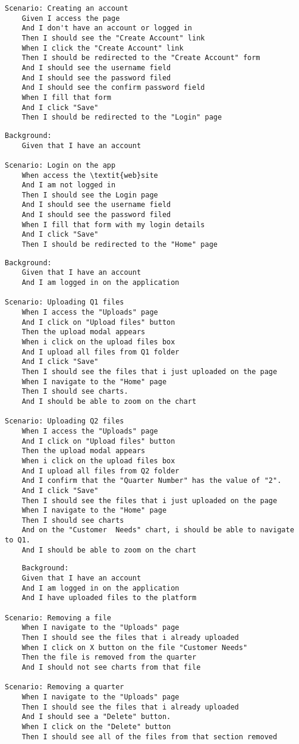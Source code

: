 \begin{verbatim}
Scenario: Creating an account
    Given I access the page 
    And I don't have an account or logged in
    Then I should see the "Create Account" link
    When I click the "Create Account" link
    Then I should be redirected to the "Create Account" form
    And I should see the username field
    And I should see the password filed
    And I should see the confirm password field
    When I fill that form
    And I click "Save"
    Then I should be redirected to the "Login" page
\end{verbatim}



\begin{verbatim}
Background:
	Given that I have an account

Scenario: Login on the app
	When access the \textit{web}site
	And I am not logged in
	Then I should see the Login page
	And I should see the username field
	And I should see the password filed
	When I fill that form with my login details
	And I click "Save"
	Then I should be redirected to the "Home" page
\end{verbatim}
    
\begin{verbatim}
Background:
	Given that I have an account
	And I am logged in on the application

Scenario: Uploading Q1 files
	When I access the "Uploads" page  
	And I click on "Upload files" button 
	Then the upload modal appears 
	When i click on the upload files box
	And I upload all files from Q1 folder
	And I click "Save"
	Then I should see the files that i just uploaded on the page
	When I navigate to the "Home" page
	Then I should see charts. 
	And I should be able to zoom on the chart
	
Scenario: Uploading Q2 files
	When I access the "Uploads" page  
	And I click on "Upload files" button 
	Then the upload modal appears 
	When i click on the upload files box
	And I upload all files from Q2 folder
	And I confirm that the "Quarter Number" has the value of "2".
	And I click "Save"
	Then I should see the files that i just uploaded on the page
	When I navigate to the "Home" page
	Then I should see charts
	And on the "Customer  Needs" chart, i should be able to navigate to Q1.
	And I should be able to zoom on the chart
\end{verbatim}

\begin{verbatim}
    Background:  
	Given that I have an account
	And I am logged in on the application
	And I have uploaded files to the platform
 
Scenario: Removing a file
	When I navigate to the "Uploads" page  
	Then I should see the files that i already uploaded
	When I click on X button on the file "Customer Needs"
	Then the file is removed from the quarter
	And I should not see charts from that file
	
Scenario: Removing a quarter
	When I navigate to the "Uploads" page  
	Then I should see the files that i already uploaded
	And I should see a "Delete" button.
	When I click on the "Delete" button
	Then I should see all of the files from that section removed 
\end{verbatim}

